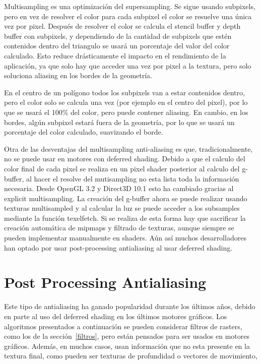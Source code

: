 \documentclass[withindex, glossary]{cam-thesis}
\begin{document}
Multisampling es una optimización del supersampling. Se sigue usando subpixels, pero en vez de resolver el color para cada subpixel el color se resuelve una única vez por pixel. Después de resolver el color se calcula el stencil buffer y depth buffer con subpixels, y dependiendo de la cantidad de subpixels que estén contenidos dentro del triangulo se usará un porcentaje del valor del color calculado. Esto reduce drásticamente el impacto en el rendimiento de la aplicación, ya que solo hay que acceder una vez por pixel a la textura, pero solo soluciona aliasing en los bordes de la geometría.

En el centro de un polígono todos los subpixels van a estar contenidos dentro, pero el color solo se calcula una vez (por ejemplo en el centro del pixel), por lo que se usará el 100\% del color, pero puede contener aliasing. En cambio, en los bordes, algún subpixel estará fuera de la geometría, por lo que se usará un porcentaje del color calculado, suavizando el borde.

Otra de las desventajas del multisampling anti-aliasing es que, tradicionalmente, no se puede usar en motores con deferred shading. Debido a que el calculo del color final de cada pixel se realiza en un pixel shader posterior al calculo del g-buffer, al hacer el resolve del mutisampling no esta lista toda la información necesaria. Desde OpenGL 3.2 y Direct3D 10.1 esto ha cambiado gracias al explicit multisampling\cite{textureMultisample}. La creación del g-buffer ahora se puede realizar usando texturas multisampled y al calcular la luz se puede acceder a los subsamples mediante la función texelfetch. Si se realiza de esta forma hay que sacrificar la creación automática de mipmaps y filtrado de texturas, aunque siempre se pueden implementar manualmente en shaders. Aún así muchos desarrolladores han optado por usar post-processing antialiasing al usar deferred shading.

\section{Post Processing Antialiasing}

Este tipo de antialiasing ha ganado popularidad durante los últimos años, debido en parte al uso del deferred shading en los últimos motores gráficos. Los algoritmos presentados a continuación se pueden considerar filtros de rasters, como los de la sección~\ref{filtros}, pero están pensados para ser usados en motores gráficos. Además, en muchos casos, usan información que no esta presente en la textura final, como pueden ser texturas de profundidad o vectores de movimiento,
\end{document}
